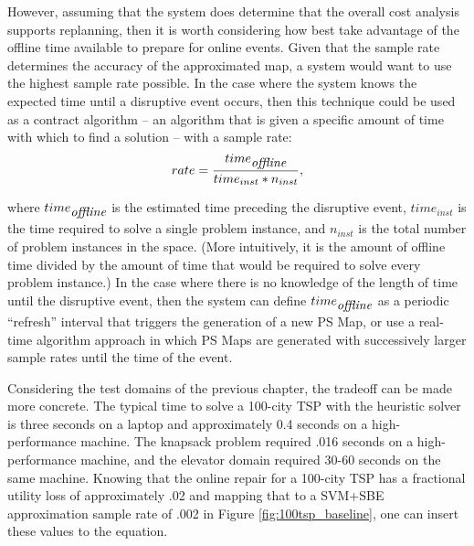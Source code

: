 However, assuming that the system does determine that the overall cost analysis supports replanning, then it is worth considering how best take advantage of the offline time available to prepare for online events.  Given that the sample rate determines the accuracy of the approximated map, a system would want to use the highest sample rate possible.  In the case where the system knows the expected time until a disruptive event occurs, then this technique could be used as a contract algorithm \citep{Zilberstein99real-timeproblem-solving} -- an algorithm that is given a specific amount of time with which to find a solution -- with a sample rate:
\begin{equation*}
rate = \frac{time_{\mbox{\itshape offline}}}{time_{inst}*n_{inst}} ,
\label{eq:tradeoff}
\end{equation*}

\noindent
where $time_{\mbox{\itshape offline}}$ is the estimated time preceding the disruptive event, $time_{inst}$ is the time required to solve a single problem instance, and $n_{inst}$ is the total number of problem instances in the space.  (More intuitively, it is the amount of offline time divided by the amount of time that would be required to solve every problem instance.) In the case where there is no knowledge of the length of time until the disruptive event, then the system can define  $time_{\mbox{\itshape offline}}$ as a periodic ``refresh'' interval that triggers the generation of a new PS Map, or use a real-time algorithm approach in which PS Maps are generated with successively larger sample rates until the time of the event.

Considering the test domains of the previous chapter, the tradeoff can be made more concrete.  The typical time to solve a 100-city TSP with the heuristic solver is three seconds on a laptop and  approximately 0.4 seconds on a high-performance machine.  The knapsack problem required .016 seconds on a high-performance machine, and the elevator domain required 30-60 seconds on the same machine.  Knowing that the online repair for a 100-city TSP has a fractional utility loss of approximately .02 and mapping that to a SVM+SBE approximation sample rate of .002 in Figure \ref{fig:100tsp_baseline}, one can insert these values to the equation.

